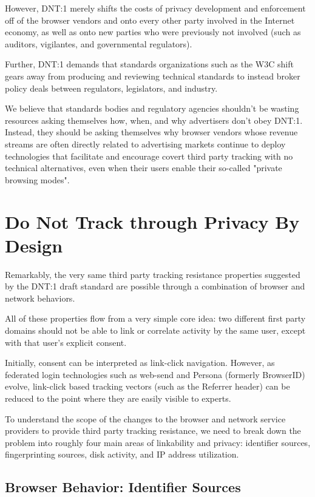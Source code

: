 \documentclass[letterpaper,11pt]{llncs}
\begin{document}
However, DNT:1 merely shifts the costs of privacy development and enforcement
off of the browser vendors and onto every other party involved in the Internet
economy, as well as onto new parties who were previously not involved (such as
auditors, vigilantes, and governmental regulators).

Further, DNT:1 demands that standards organizations such as the W3C shift
gears away from producing and reviewing technical standards to instead
broker policy deals between regulators, legislators, and industry.

We believe that standards bodies and regulatory agencies shouldn't be wasting
resources asking themselves how, when, and why advertisers don't obey DNT:1.
Instead, they should be asking themselves why browser vendors whose revenue
streams are often directly related to advertising markets continue to deploy
technologies that facilitate and encourage covert third party tracking with no
technical alternatives, even when their users enable their so-called "private
browsing modes".

\section{Do Not Track through Privacy By Design}

Remarkably, the very same third party tracking resistance properties suggested
by the DNT:1 draft standard are possible through a combination of browser and
network behaviors.

All of these properties flow from a very simple core idea: two different first
party domains should not be able to link or correlate activity by the same
user, except with that user's explicit consent.

Initially, consent can be interpreted as link-click navigation. However, as
federated login technologies such as web-send\cite{web-send} and
Persona\cite{Persona} (formerly BrowserID) evolve, link-click based tracking
vectors (such as the Referrer header) can be reduced to the point where they
are easily visible to experts.

To understand the scope of the changes to the browser and network service
providers to provide third party tracking resistance, we need to break down
the problem into roughly four main areas of linkability and privacy:
identifier sources, fingerprinting sources, disk activity, and IP address
utilization.

\subsection{Browser Behavior: Identifier Sources}
\end{document}
